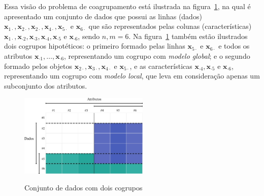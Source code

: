 \documentclass[
    12pt,                %
    oneside,            %
    a4paper,            %
    english,            %
    brazil                %
    ]{abntex2ppgsi}
\begin{document}
Essa visão do problema de coagrupamento está ilustrada na figura~\ref{fig:bicluster-exp}, na qual é apresentado um conjunto de dados que possui as linhas (dados) $\mathbf{x}_{1 \cdot}, \mathbf{x}_{2 \cdot}, \mathbf{x}_{2 \cdot}, \mathbf{x}_{4 \cdot}, \mathbf{x}_{5 \cdot}$ e $\mathbf{x}_{6 \cdot}$ que são representados pelas colunas (características) $\mathbf{x}_{1 \cdot}, \mathbf{x}_{\cdot 2}, \mathbf{x}_{\cdot 3}, \mathbf{x}_{\cdot 4}, \mathbf{x}_{\cdot 5}$ e $\mathbf{x}_{\cdot 6}$, sendo $n,m = 6$.
Na figura~\ref{fig:bicluster-exp} também estão ilustrados dois cogrupos hipotéticos: o primeiro formado pelas linhas $\mathbf{x}_{5 \cdot}$ e $\mathbf{x}_{6 \cdot}$ e todos os atributos $\mathbf{x}_{\cdot 1}, \dots, \mathbf{x}_{\cdot 6}$, representando um cogrupo com \textit{modelo global}; e o segundo formado pelos objetos $\mathbf{x}_{2 \cdot}, \mathbf{x}_{3 \cdot}, \mathbf{x}_{4 \cdot}$ e $\mathbf{x}_{5 \cdot}$, e as características $\mathbf{x}_{\cdot 4}, \mathbf{x}_{\cdot 5}$ e $\mathbf{x}_{\cdot 6}$, representando um cogrupo com \textit{modelo local}, que leva em consideração apenas um subconjunto dos atributos.

\begin{figure}[H]
\centering
    \caption{Conjunto de dados com dois cogrupos}
    \includegraphics[width=0.55\textwidth]{img/bicluster.png}
    \label{fig:bicluster-exp}
\end{figure}
\end{document}

